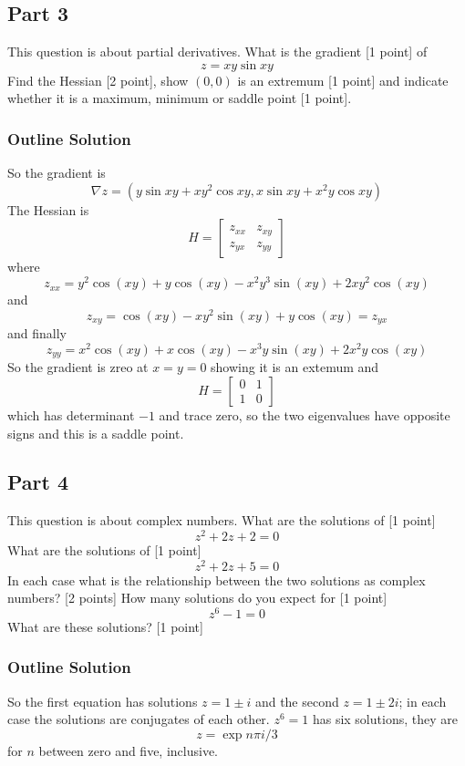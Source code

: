 \documentclass[11pt,a4paper]{scrartcl}
\begin{document}
      \subsection*{Part 3}
      This question is about partial derivatives. What is the gradient [1 point] of
      $$
      z=xy\sin{xy}
      $$
      Find the Hessian [2 point], show $(0,0)$ is an extremum [1 point] and indicate whether it is a maximum, minimum or saddle point [1 point].

      \subsubsection{Outline Solution}
      So the gradient is
      $$\nabla z=\left(y\sin{xy}+xy^2\cos{xy},x\sin{xy}+x^2y\cos{xy}\right)$$
      The Hessian is
      $$H=\left[\begin{array}{cc}z_{xx}&z_{xy}\\z_{yx}&z_{yy}\end{array}\right]$$
      where
      $$z_{xx} = y^2\cos(xy) + y\cos(xy) - x^2y^3\sin(xy) + 2xy^2\cos(xy)$$
      and
      $$z_{xy} = \cos(xy) - xy^2\sin(xy) + y\cos(xy)=z_{yx}$$
      and finally
$$z_{yy}= x^2\cos(xy) + x\cos(xy) - x^3y\sin(xy) + 2x^2y\cos(xy)$$
      So the gradient is zreo at $x=y=0$ showing it is an extemum and
      $$H=\left[\begin{array}{cc}0&1\\1&0\end{array}\right]$$
      which has determinant $-1$ and trace zero, so the two eigenvalues have opposite signs and this is a saddle point.

      \subsection*{Part 4}
      This question is about complex numbers. What are the solutions of [1 point]
      $$z^2+2z+2=0$$
      What are the solutions of [1 point]
      $$z^2+2z+5=0$$
      In each case what is the relationship between the two solutions as complex numbers? [2 points]
      How many solutions do you expect for [1 point]
      $$z^{6}-1=0$$
      What are these solutions? [1 point]

      \subsubsection*{Outline Solution}
      So the first equation has solutions $z=1\pm i$ and the second $z=1\pm 2i$; in each case the solutions are conjugates of each other. $z^6=1$ has six solutions, they are
      \begin{equation}
        z=\exp{n\pi i/3}
      \end{equation}
      for $n$ between zero and five, inclusive.
\end{document}
